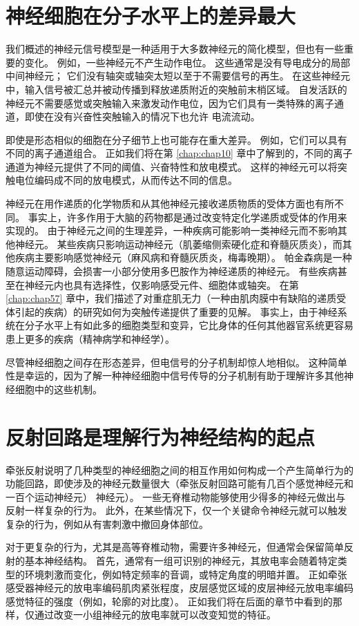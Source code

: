 \section{神经细胞在分子水平上的差异最大}
我们概述的神经元信号模型是一种适用于大多数神经元的简化模型，但也有一些重要的变化。 
例如，一些神经元不产生动作电位。 
这些通常是没有导电成分的局部中间神经元； 它们没有轴突或轴突太短以至于不需要信号的再生。 
在这些神经元中，输入信号被汇总并被动传播到释放递质附近的突触前末梢区域。 
自发活跃的神经元不需要感觉或突触输入来激发动作电位，因为它们具有一类特殊的离子通道，即使在没有兴奋性突触输入的情况下也允许  电流流动。


即使是形态相似的细胞在分子细节上也可能存在重大差异。 
例如，它们可以具有不同的离子通道组合。 
正如我们将在第 \ref{chap:chap10} 章中了解到的，不同的离子通道为神经元提供了不同的阈值、兴奋特性和放电模式。 
这样的神经元可以将突触电位编码成不同的放电模式，从而传达不同的信息。


神经元在用作递质的化学物质和从其他神经元接收递质物质的受体方面也有所不同。 
事实上，许多作用于大脑的药物都是通过改变特定化学递质或受体的作用来实现的。 
由于神经元之间的生理差异，一种疾病可能影响一类神经元而不影响其他神经元。 
某些疾病只影响运动神经元（肌萎缩侧索硬化症和脊髓灰质炎），而其他疾病主要影响感觉神经元（麻风病和脊髓灰质炎，梅毒晚期）。 
帕金森病是一种随意运动障碍，会损害一小部分使用多巴胺作为神经递质的神经元。 
有些疾病甚至在神经元内也具有选择性，仅影响感受元件、细胞体或轴突。 
在第 \ref{chap:chap57} 章中，我们描述了对重症肌无力（一种由肌肉膜中有缺陷的递质受体引起的疾病）的研究如何为突触传递提供了重要的见解。 
事实上，由于神经系统在分子水平上有如此多的细胞类型和变异，它比身体的任何其他器官系统更容易患上更多的疾病（精神病学和神经学）。


尽管神经细胞之间存在形态差异，但电信号的分子机制却惊人地相似。 
这种简单性是幸运的，因为了解一种神经细胞中信号传导的分子机制有助于理解许多其他神经细胞中的这些机制。


\section{反射回路是理解行为神经结构的起点}
牵张反射说明了几种类型的神经细胞之间的相互作用如何构成一个产生简单行为的功能回路，即使涉及的神经元数量很大（牵张反射回路可能有几百个感觉神经元和一百个运动神经元） 神经元）。 
一些无脊椎动物能够使用少得多的神经元做出与反射一样复杂的行为。 
此外，在某些情况下，仅一个关键命令神经元就可以触发复杂的行为，例如从有害刺激中撤回身体部位。


对于更复杂的行为，尤其是高等脊椎动物，需要许多神经元，但通常会保留简单反射的基本神经结构。 
首先，通常有一组可识别的神经元，其放电率会随着特定类型的环境刺激而变化，例如特定频率的音调，或特定角度的明暗并置。 
正如牵张感受器神经元的放电率编码肌肉紧张程度，皮层感觉区域的皮层神经元放电率编码感觉特征的强度（例如，轮廓的对比度）。 
正如我们将在后面的章节中看到的那样，仅通过改变一小组神经元的放电率就可以改变知觉的特征。


